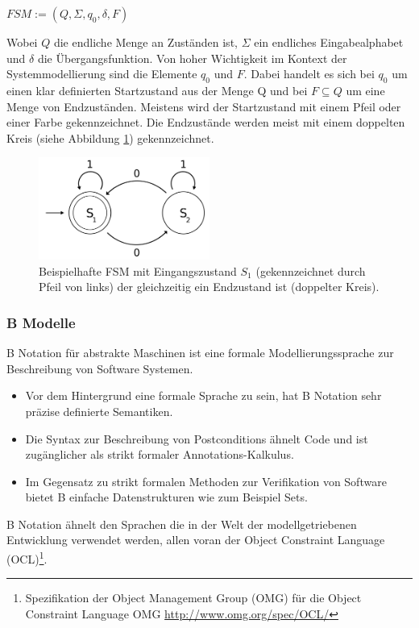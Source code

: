 \begin{center}
$FSM := (Q, \Sigma, q_0, \delta, F)$
\end{center}

Wobei $Q$ die endliche Menge an Zuständen ist, $\Sigma$ ein endliches Eingabealphabet und $\delta$ die Übergangsfunktion. Von hoher Wichtigkeit im Kontext der Systemmodellierung sind die Elemente $q_0$ und $F$. Dabei handelt es sich bei $q_0$ um einen klar definierten Startzustand aus der Menge Q und bei $F \subseteq Q$ um eine Menge von Endzuständen. Meistens wird der Startzustand mit einem Pfeil oder einer Farbe gekennzeichnet. Die Endzustände werden meist mit einem doppelten Kreis (siehe Abbildung \ref{fig:fsm_example}) gekennzeichnet.

\begin{figure}[h] 
  \centering
     \includegraphics[width=0.5\textwidth]{figures/FSM_example.png}
  \caption{Beispielhafte FSM mit Eingangszustand $S_1$ (gekennzeichnet durch Pfeil von links) der gleichzeitig ein Endzustand ist (doppelter Kreis).}
  \label{fig:fsm_example}
\end{figure}

\subsubsection{B Modelle}
B Notation für abstrakte Maschinen ist eine formale Modellierungssprache zur Beschreibung von Software Systemen.
\begin{itemize}
\item Vor dem Hintergrund eine formale Sprache zu sein, hat B Notation sehr präzise definierte Semantiken.
\item Die Syntax zur Beschreibung von Postconditions ähnelt Code und ist zugänglicher als strikt formaler Annotations-Kalkulus\cite{huth_logic_2004}.
\item Im Gegensatz zu strikt formalen Methoden zur Verifikation von Software bietet B einfache Datenstrukturen wie zum Beispiel Sets.
\end{itemize}

B Notation ähnelt den Sprachen die in der Welt der modellgetriebenen Entwicklung verwendet werden, allen voran der Object Constraint Language (OCL)\footnote{Spezifikation der Object Management Group (OMG) für die Object Constraint Language OMG \url{http://www.omg.org/spec/OCL/}}.
